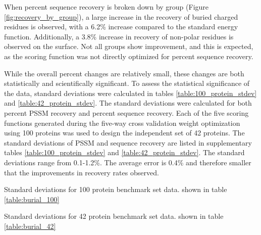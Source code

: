  When percent sequence recovery is broken down by group (Figure \ref{fig:recovery_by_group}), a large increase in the recovery of buried charged residues is observed, with a 6.2\% increase compared to the standard energy function. 
 Additionally, a 3.8\% increase in recovery of non-polar residues is observed on the surface.
 Not all groups show improvement, and this is expected, as the scoring function was not directly optimized for percent sequence recovery.
 
While the overall percent changes are relatively small, these changes are both statistically and scientifically significant.
To assess the statistical significance of the data, standard deviations were calculated in tables \ref{table:100_protein_stdev} and \ref{table:42_protein_stdev}.
The standard deviations were calculated for both percent PSSM recovery and percent sequence recovery.
Each of the five scoring functions generated during the five-way cross validation weight optimization using 100 proteins was used to design the independent set of 42 proteins.
The standard deviations of PSSM and sequence recovery are listed in supplementary tables \ref{table:100_protein_stdev} and \ref{table:42_protein_stdev}.
The standard deviations range from 0.1-1.2\%. 
The average error is 0.4\% and therefore smaller that the improvements in recovery rates observed. 

\begin{table}
\scriptsize
\renewcommand{\tabcolsep}{0.09cm}
\centering

\caption{Standard deviations for 100 protein benchmark set data. shown in table \ref{table:burial_100}}
\label{table:100_protein_stdev}
\end{table}

\begin{table}
\scriptsize
\renewcommand{\tabcolsep}{0.09cm}
\centering

\caption{Standard deviations for 42 protein benchmark set data. shown in table \ref{table:burial_42}}
\label{table:42_protein_stdev}
\end{table}

